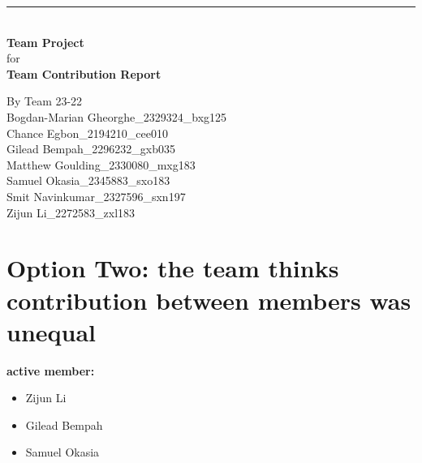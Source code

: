 \documentclass[a4paper]{article}
\begin{document}

\begin{titlepage}
	
	\rule{\linewidth}{5pt}
	\raggedleft
	\fontsize{38pt}{50pt}\selectfont
    \textbf{\\Team Project\\}
    \fontsize{28pt}{60pt}\selectfont 
    for\\
    \fontsize{38pt}{60pt}\selectfont 
    \textbf{Team Contribution Report\\}
	
	\vfill %
	
	
	\parbox[t]{0.93\textwidth}{ %
		\raggedleft %
		\large %
		{\Large By Team 23-22}\\[4pt] %
		Bogdan-Marian Gheorghe\_2329324\_bxg125\\
		Chance Egbon\_2194210\_cee010\\
		Gilead Bempah\_2296232\_gxb035\\
		Matthew Goulding\_2330080\_mxg183\\
		Samuel Okasia\_2345883\_sxo183\\
		Smit Navinkumar\_2327596\_sxn197\\
		Zijun Li\_2272583\_zxl183\\
	}
	
\end{titlepage}

\section*{Option Two: the team thinks contribution between members was unequal}

\textbf{active member: }
\begin{itemize}
    \item Zijun Li
    \item Gilead Bempah
    \item Samuel Okasia
\end{itemize}
\end{document}
